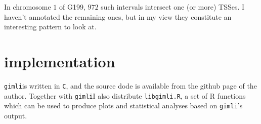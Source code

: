 \documentclass[12pt]{amsart}
\newcommand{\gimli}{\texttt{gimli}}
\begin{document}
In chromosome $1$ of G199, $972$ such intervals intersect one (or more) 
TSSes. I haven't annotated the remaining ones, but in my view they constitute
an interesting pattern to look at.

\section{implementation}

\gimli is written in \texttt{C}, and the source
dode is available from the github page of the author. Together
with \gimli I also distribute \texttt{libgimli.R},
a set of R functions which can be used to produce plots and statistical
analyses based on \gimli's output.



\end{document}
